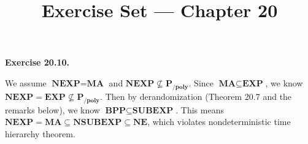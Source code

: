 \documentclass[a4paper]{article}
\title{Exercise Set --- Chapter 20}
\date{}
\newenvironment{exercise}[1]{
	\par
	\noindent\textbf{Exercise #1.}\quad
}{
	\par
	\bigskip
}
\newcommand{\NEXP}{\textbf{NEXP}}
\newcommand{\MA}{\textbf{MA}}
\newcommand{\Ppoly}{\textbf{P}_\textbf{/poly}}
\newcommand{\EXP}{\textbf{EXP}}
\newcommand{\BPP}{\textbf{BPP}}
\newcommand{\NE}{\textbf{NE}}
\newcommand{\SUBEXP}{\textbf{SUBEXP}}
\newcommand{\NSUBEXP}{\textbf{NSUBEXP}}
\begin{document}
    \maketitle

    \begin{exercise}{20.10}
        We assume $\NEXP=\MA$ and $\NEXP\not\subseteq\Ppoly$. 
        Since $\MA\subseteq\EXP$, we know $\NEXP=\EXP\not\subseteq\Ppoly$.
        Then by derandomization (Theorem 20.7 and the remarks below), we know $\BPP\subseteq\SUBEXP$.
        This means $\NEXP=\MA\subseteq\NSUBEXP\subseteq\NE$, which violates nondeterministic time hierarchy theorem.
    \end{exercise}
\end{document}
